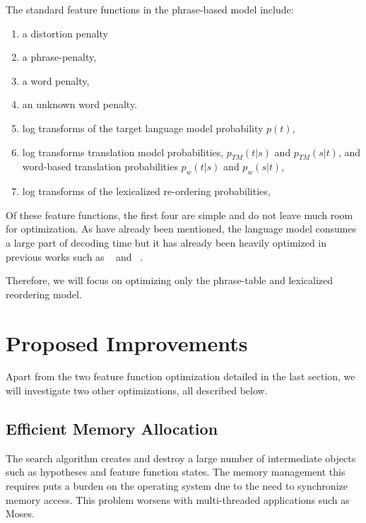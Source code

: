 \documentclass[11pt]{article}
\begin{document}
The standard feature functions in the phrase-based model include:
\begin{enumerate}
  \item \vspace{-2 mm} a distortion penalty
  \item \vspace{-2 mm} a phrase-penalty,
  \item \vspace{-2 mm} a word penalty,
  \item \vspace{-2 mm} an unknown word penalty.
  \item \vspace{-2 mm} log transforms of the target language model probability $p(t)$, 
  \item \vspace{-2 mm} log transforms translation model probabilities, $p_{TM}(t|s) $ and $p_{TM}(s|t)$, and word-based translation probabilities $p_w(t|s)$ and $p_w(s|t)$,
  \item \vspace{-2 mm} log transforms of the lexicalized re-ordering probabilities,
\end{enumerate}

Of these feature functions, the first four are simple and do not leave much room for optimization. As have already been mentioned, the language model consumes a large part of decoding time but it has already been heavily optimized in previous works such as ~ and ~.

Therefore, we will focus on optimizing only the phrase-table and lexicalized reordering model.

\section{Proposed Improvements}

Apart from the two feature function optimization detailed in the last section, we will investigate two other optimizations, all described below.

\subsection{Efficient Memory Allocation}

The search algorithm creates and destroy a large number of intermediate objects such as hypotheses and feature function states. The memory management this requires puts a burden on the operating system due to the need to synchronize memory access. This problem worsens with multi-threaded applications such as Moses.
\end{document}
